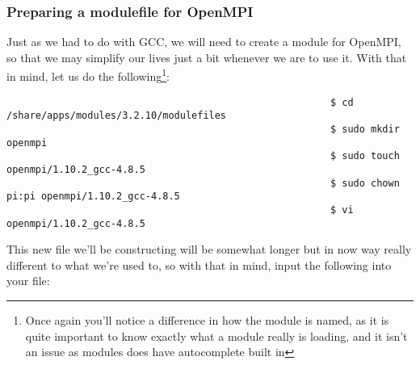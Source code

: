 \documentclass[]{article}
\begin{document}
                                                    \subsubsection{Preparing a modulefile for OpenMPI}
                                                    Just as we had to do with GCC, we will need to create a module for OpenMPI, so that we may simplify our lives just a bit whenever we are 
                                                    to use it. With that in mind, let us do the following\footnote{Once again you'll notice a difference in how the module is named, as it
                                                        is quite important to know exactly what a module really is loading, and it isn't an issue as modules does have autocomplete built in}:
                                                        \begin{lstlisting}
                                                        $ cd /share/apps/modules/3.2.10/modulefiles
                                                        $ sudo mkdir openmpi
                                                        $ sudo touch openmpi/1.10.2_gcc-4.8.5
                                                        $ sudo chown pi:pi openmpi/1.10.2_gcc-4.8.5
                                                        $ vi openmpi/1.10.2_gcc-4.8.5
                                                        \end{lstlisting}
                                                        This new file we'll be constructing will be somewhat longer but in now way really different to what we're used to, so with that in mind, 
                                                        input the following into your file:
\end{document}
